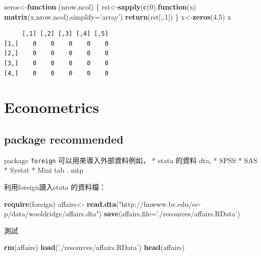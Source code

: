 \documentclass[]{book}
\newenvironment{Shaded}{\begin{snugshade}}{\end{snugshade}}
\newcommand{\ControlFlowTok}[1]{\textcolor[rgb]{0.13,0.29,0.53}{\textbf{#1}}}
\newcommand{\DataTypeTok}[1]{\textcolor[rgb]{0.13,0.29,0.53}{#1}}
\newcommand{\DecValTok}[1]{\textcolor[rgb]{0.00,0.00,0.81}{#1}}
\newcommand{\KeywordTok}[1]{\textcolor[rgb]{0.13,0.29,0.53}{\textbf{#1}}}
\newcommand{\NormalTok}[1]{#1}
\newcommand{\StringTok}[1]{\textcolor[rgb]{0.31,0.60,0.02}{#1}}
\theoremstyle{definition}
\theoremstyle{definition}
\theoremstyle{definition}
\theoremstyle{remark}
\begin{document}
\begin{Shaded}
\begin{Highlighting}[]
\NormalTok{zeros<-}\ControlFlowTok{function}\NormalTok{ (nrow,ncol)}
\NormalTok{\{}
\NormalTok{rst<-}\KeywordTok{sapply}\NormalTok{(}\KeywordTok{c}\NormalTok{(}\DecValTok{0}\NormalTok{),}\ControlFlowTok{function}\NormalTok{(x) }\KeywordTok{matrix}\NormalTok{(x,nrow,ncol),}\DataTypeTok{simplify=}\StringTok{'array'}\NormalTok{)}
  \KeywordTok{return}\NormalTok{(rst[,,}\DecValTok{1}\NormalTok{])}
\NormalTok{\}}
\NormalTok{x<-}\KeywordTok{zeros}\NormalTok{(}\DecValTok{4}\NormalTok{,}\DecValTok{5}\NormalTok{)}
\NormalTok{x}
\end{Highlighting}
\end{Shaded}

\begin{verbatim}
     [,1] [,2] [,3] [,4] [,5]
[1,]    0    0    0    0    0
[2,]    0    0    0    0    0
[3,]    0    0    0    0    0
[4,]    0    0    0    0    0
\end{verbatim}

\hypertarget{econometrics}{%
\chapter{Econometrics}\label{econometrics}}

\hypertarget{package-recommended}{%
\section{package recommended}\label{package-recommended}}

package \texttt{foreign} 可以用來導入外部資料例如， * stata 的資料 dta,
* SPSS * SAS * Systat * Mini tab . mtp

利用foreign讀入stata 的資料檔：

\begin{Shaded}
\begin{Highlighting}[]
\KeywordTok{require}\NormalTok{(foreign)}
\NormalTok{affairs<-}\StringTok{ }\KeywordTok{read.dta}\NormalTok{(}\StringTok{"http://fmwww.bc.edu/ec-p/data/wooldridge/affairs.dta"}\NormalTok{)}
\KeywordTok{save}\NormalTok{(affairs,}\DataTypeTok{file=}\StringTok{'./resources/affairs.RData'}\NormalTok{)}
\end{Highlighting}
\end{Shaded}

測試

\begin{Shaded}
\begin{Highlighting}[]
\KeywordTok{rm}\NormalTok{(affairs)}
\KeywordTok{load}\NormalTok{(}\StringTok{'./resources/affairs.RData'}\NormalTok{)}
\KeywordTok{head}\NormalTok{(affairs)}
\end{Highlighting}
\end{Shaded}
\end{document}

